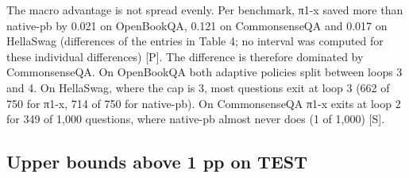 \begin{table}[t]
\centering\small
\caption{TEST results under the bootstrap-screened rule, per primary benchmark {[}S, descriptive{]}. Savings are gross. The upper bound is the one-sided 95\% paired-bootstrap bound of the loss on TEST. Bold marks bounds above 1 pp.}
\end{table}

The macro advantage is not spread evenly. Per benchmark, π1-x saved more than native-pb by 0.021 on OpenBookQA, 0.121 on CommonsenseQA and 0.017 on HellaSwag (differences of the entries in Table 4; no interval was computed for these individual differences) {[}P{]}. The difference is therefore dominated by CommonsenseQA. On OpenBookQA both adaptive policies split between loops 3 and 4. On HellaSwag, where the cap is 3, most questions exit at loop 3 (662 of 750 for π1-x, 714 of 750 for native-pb). On CommonsenseQA π1-x exits at loop 2 for 349 of 1,000 questions, where native-pb almost never does (1 of 1,000) {[}S{]}.

\subsection{Upper bounds above 1 pp on TEST}

